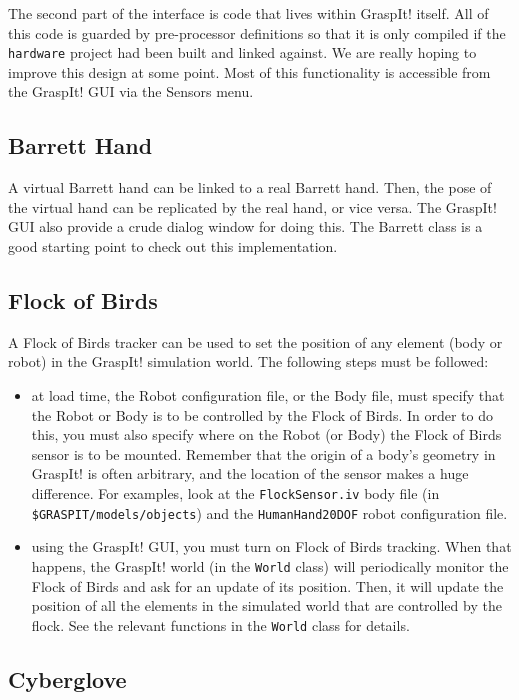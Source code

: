 The second part of the interface is code that lives within GraspIt!
itself. All of this code is guarded by pre-processor definitions so
that it is only compiled if the \texttt{hardware} project had been
built and linked against. We are really hoping to improve this design
at some point. Most of this functionality is accessible from the
GraspIt! GUI via the Sensors menu.

\subsection{Barrett Hand}

A virtual Barrett hand can be linked to a real Barrett hand. Then, the
pose of the virtual hand can be replicated by the real hand, or vice
versa. The GraspIt! GUI also provide a crude dialog window for doing
this. The Barrett class is a good starting point to check out this
implementation.

\subsection{Flock of Birds}

A Flock of Birds tracker can be used to set the position of any
element (body or robot) in the GraspIt! simulation world. The
following steps must be followed:
\begin{itemize}
\item at load time, the Robot configuration file, or the Body file,
  must specify that the Robot or Body is to be controlled by the Flock
  of Birds. In order to do this, you must also specify where on the
  Robot (or Body) the Flock of Birds sensor is to be mounted. Remember
  that the origin of a body's geometry in GraspIt! is often arbitrary,
  and the location of the sensor makes a huge difference. For
  examples, look at the \texttt{FlockSensor.iv} body file (in
  \texttt{\$GRASPIT/models/objects}) and the \texttt{HumanHand20DOF}
  robot configuration file.
\item using the GraspIt! GUI, you must turn on Flock of Birds
  tracking. When that happens, the GraspIt! world (in the
  \texttt{World} class) will periodically monitor the Flock of Birds
  and ask for an update of its position. Then, it will update the
  position of all the elements in the simulated world that are
  controlled by the flock. See the relevant functions in the
  \texttt{World} class for details.
\end{itemize}

\subsection{Cyberglove}

